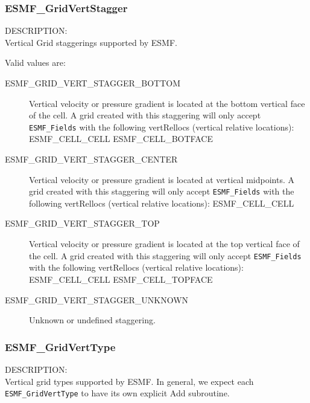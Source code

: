  \subsubsection{ESMF\_GridVertStagger}

 {\sf DESCRIPTION:\\}
 Vertical Grid staggerings supported by ESMF.

 Valid values are:
 \begin{description}

    \item [ESMF\_GRID\_VERT\_STAGGER\_BOTTOM]
          Vertical velocity or pressure gradient is located at the bottom vertical 
          face of the cell.  A grid created with this staggering will only accept
          {\tt ESMF\_Fields} with the following vertRellocs (vertical relative
          locations):
              ESMF\_CELL\_CELL
              ESMF\_CELL\_BOTFACE

    \item [ESMF\_GRID\_VERT\_STAGGER\_CENTER] 
          Vertical velocity or pressure gradient is located at vertical midpoints.
          A grid created with this staggering will only accept {\tt ESMF\_Fields}
          with the following vertRellocs (vertical relative locations):
              ESMF\_CELL\_CELL

    \item [ESMF\_GRID\_VERT\_STAGGER\_TOP]
          Vertical velocity or pressure gradient is located at the top vertical 
          face of the cell.  A grid created with this staggering will only accept
          {\tt ESMF\_Fields} with the following vertRellocs (vertical relative
          locations):
              ESMF\_CELL\_CELL
              ESMF\_CELL\_TOPFACE

    \item [ESMF\_GRID\_VERT\_STAGGER\_UNKNOWN]
          Unknown or undefined staggering.

 \end{description}


 \subsubsection{ESMF\_GridVertType}
 
 {\sf DESCRIPTION:\\}
 Vertical grid types supported by ESMF.  In general, we expect each
 {\tt ESMF\_GridVertType} to have its own explicit Add subroutine.
 

